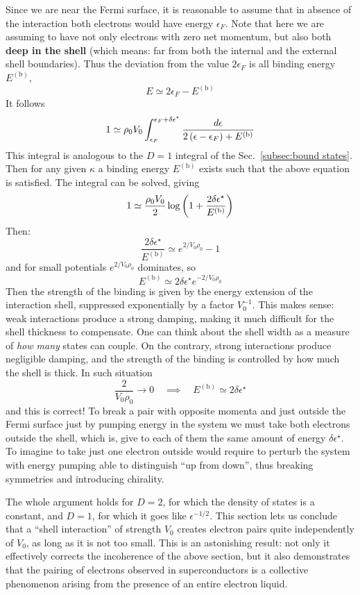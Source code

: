 Since we are near the Fermi surface, it is reasonable to assume that in absence of the interaction both electrons would have energy $\epsilon_F$. Note that here we are assuming to have not only electrons with zero net momentum, but also both \textbf{deep in the shell} (which means: far from both the internal and the external shell boundaries). Thus the deviation from the value $2\epsilon_F$ is all binding energy $E^{(\mathrm{b})}$,
\[
	E \simeq 2 \epsilon_F - E^{(\mathrm{b})}
\]
It follows
\[
	1 \simeq \rho_0 V_0 \int_{\epsilon_F}^{\epsilon_F+\delta\epsilon^\star} \frac{d\epsilon}{2\left({\epsilon-\epsilon_F}\right) + E^{(\mathrm{b})}}
\]
This integral is analogous to the $D=1$ integral of the Sec.~\ref{subsec:bound states}. Then for any given $\kappa$ a binding energy $E^{(\mathrm{b})}$ exists such that the above equation is satisfied. The integral can be solved, giving
\[
	1 \simeq \frac{\rho_0 V_0}{2} \log \left({1+ \frac{2\delta\epsilon^\star}{E^{(\mathrm{b})}}}\right)
\]
Then:
\[
	\frac{2\delta\epsilon^\star}{E^{(\mathrm{b})}} \simeq e^{2/V_0 \rho_0} - 1
\]
and for small potentials $e^{2/V_0 \rho_0}$ dominates, so
\[
	E^{(\mathrm{b})} \simeq 2\delta\epsilon^\star e^{-2/V_0 \rho_0}
\]
Then the strength of the binding is given by the energy extension of the interaction shell, suppressed exponentially by a factor $V_0^{-1}$. This makes sense: weak interactions produce a strong damping, making it much difficult for the shell thickness to compensate. One can think about the shell width as a measure of \textit{how many} states can couple. On the contrary, strong interactions produce negligible damping, and the strength of the binding is controlled by how much the shell is thick.
In such situation
\[
	\frac{2}{V_0 \rho_0} \to 0
	\quad\implies\quad
	E^{(\mathrm{b})} \simeq 2\delta\epsilon^\star
\]
and this is correct! To break a pair with opposite momenta and just outside the Fermi surface just by pumping energy in the system we must take both electrons outside the shell, which is, give to each of them the same amount of energy $\delta\epsilon^\star$. To imagine to take just one electron outside would require to perturb the system with energy pumping able to distinguish ``up from down'', thus breaking symmetries and introducing chirality.

The whole argument holds for $D=2$, for which the density of states is a constant, and $D=1$, for which it goes like $\epsilon^{-1/2}$. This section lets us conclude that a ``shell interaction'' of strength $V_0$ creates electron pairs quite independently of $V_0$, as long as it is not too small. This is an astonishing result: not only it effectively corrects the incoherence of the above section, but it also demonstrates that the pairing of electrons observed in superconductors is a collective phenomenon arising from the presence of an entire electron liquid.

